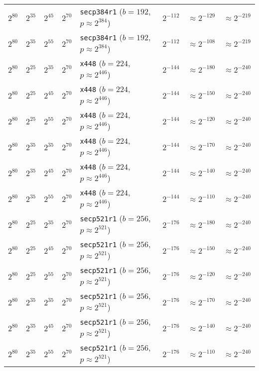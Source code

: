 \begin{table}[p]
{\begin{tabular}{@{}llllllll@{}}
$2^{80}$	&$2^{35}$	&$2^{45}$	&$2^{70}$	&\texttt{secp384r1} ($b \!=\! 192$, \! $p \!\approx\! 2^{384}$)	&$2^{-112}$	&\cellcolor{green!25}$\approx 2^{-129}$	&\cellcolor{green!25}$\approx 2^{-219}$	\\
$2^{80}$	&$2^{35}$	&$2^{55}$	&$2^{70}$	&\texttt{secp384r1} ($b \!=\! 192$, \! $p \!\approx\! 2^{384}$)	&$2^{-112}$	&$\approx 2^{-108}$	& \cellcolor{green!25}$\approx 2^{-219}$	\\
\midrule
$2^{80}$	&$2^{25}$	&$2^{35}$	&$2^{70}$	&\texttt{x448} ($b \!=\! 224$, \! $p \!\approx\! 2^{446}$)	&$2^{-144}$	&\cellcolor{green!25}$\approx 2^{-180}$	&\cellcolor{green!25}$\approx 2^{-240}$	\\
$2^{80}$	&$2^{25}$	&$2^{45}$	&$2^{70}$	&\texttt{x448} ($b \!=\! 224$, \! $p \!\approx\! 2^{446}$)	&$2^{-144}$	&\cellcolor{green!25}$\approx 2^{-150}$	&\cellcolor{green!25}$\approx 2^{-240}$	\\
$2^{80}$	&$2^{25}$	&$2^{55}$	&$2^{70}$	&\texttt{x448} ($b \!=\! 224$, \! $p \!\approx\! 2^{446}$)	&$2^{-144}$	&$\approx 2^{-120}$	& \cellcolor{green!25}$\approx 2^{-240}$	\\
$2^{80}$	&$2^{35}$	&$2^{35}$	&$2^{70}$	&\texttt{x448} ($b \!=\! 224$, \! $p \!\approx\! 2^{446}$)	&$2^{-144}$	&\cellcolor{green!25}$\approx 2^{-170}$	&\cellcolor{green!25}$\approx 2^{-240}$	\\
$2^{80}$	&$2^{35}$	&$2^{45}$	&$2^{70}$	&\texttt{x448} ($b \!=\! 224$, \! $p \!\approx\! 2^{446}$)	&$2^{-144}$	&$\approx 2^{-140}$	& \cellcolor{green!25}$\approx 2^{-240}$	\\
$2^{80}$	&$2^{35}$	&$2^{55}$	&$2^{70}$	&\texttt{x448} ($b \!=\! 224$, \! $p \!\approx\! 2^{446}$)	&$2^{-144}$	&$\approx 2^{-110}$	& \cellcolor{green!25}$\approx 2^{-240}$	\\
\midrule
$2^{80}$	&$2^{25}$	&$2^{35}$	&$2^{70}$	&\texttt{secp521r1} ($b \!=\! 256$, \! $p \!\approx\! 2^{521}$)	&$2^{-176}$	&\cellcolor{green!25}$\approx 2^{-180}$	&\cellcolor{green!25}$\approx 2^{-240}$	\\
$2^{80}$	&$2^{25}$	&$2^{45}$	&$2^{70}$	&\texttt{secp521r1} ($b \!=\! 256$, \! $p \!\approx\! 2^{521}$)	&$2^{-176}$	&$\approx 2^{-150}$	& \cellcolor{green!25}$\approx 2^{-240}$	\\
$2^{80}$	&$2^{25}$	&$2^{55}$	&$2^{70}$	&\texttt{secp521r1} ($b \!=\! 256$, \! $p \!\approx\! 2^{521}$)	&$2^{-176}$	&$\approx 2^{-120}$	& \cellcolor{green!25}$\approx 2^{-240}$	\\
$2^{80}$	&$2^{35}$	&$2^{35}$	&$2^{70}$	&\texttt{secp521r1} ($b \!=\! 256$, \! $p \!\approx\! 2^{521}$)	&$2^{-176}$	&$\approx 2^{-170}$	& \cellcolor{green!25}$\approx 2^{-240}$	\\
$2^{80}$	&$2^{35}$	&$2^{45}$	&$2^{70}$	&\texttt{secp521r1} ($b \!=\! 256$, \! $p \!\approx\! 2^{521}$)	&$2^{-176}$	&$\approx 2^{-140}$	& \cellcolor{green!25}$\approx 2^{-240}$	\\
$2^{80}$	&$2^{35}$	&$2^{55}$	&$2^{70}$	&\texttt{secp521r1} ($b \!=\! 256$, \! $p \!\approx\! 2^{521}$)	&$2^{-176}$	&$\approx 2^{-110}$	& \cellcolor{green!25}$\approx 2^{-240}$	\\
\bottomrule
	\end{tabular}}
	

\end{table}
